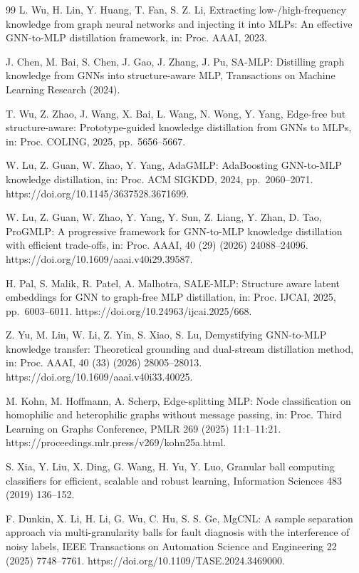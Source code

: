 \begin{thebibliography}{99}
L. Wu, H. Lin, Y. Huang, T. Fan, S. Z. Li, Extracting low-/high-frequency knowledge from graph neural networks and injecting it into MLPs: An effective GNN-to-MLP distillation framework, in: Proc. AAAI, 2023.

J. Chen, M. Bai, S. Chen, J. Gao, J. Zhang, J. Pu, SA-MLP: Distilling graph knowledge from GNNs into structure-aware MLP, Transactions on Machine Learning Research (2024).

T. Wu, Z. Zhao, J. Wang, X. Bai, L. Wang, N. Wong, Y. Yang, Edge-free but structure-aware: Prototype-guided knowledge distillation from GNNs to MLPs, in: Proc. COLING, 2025, pp.~5656--5667.

W. Lu, Z. Guan, W. Zhao, Y. Yang, AdaGMLP: AdaBoosting GNN-to-MLP knowledge distillation, in: Proc. ACM SIGKDD, 2024, pp.~2060--2071. https://doi.org/10.1145/3637528.3671699.

W. Lu, Z. Guan, W. Zhao, Y. Yang, Y. Sun, Z. Liang, Y. Zhan, D. Tao, ProGMLP: A progressive framework for GNN-to-MLP knowledge distillation with efficient trade-offs, in: Proc. AAAI, 40 (29) (2026) 24088--24096. https://doi.org/10.1609/aaai.v40i29.39587.

H. Pal, S. Malik, R. Patel, A. Malhotra, SALE-MLP: Structure aware latent embeddings for GNN to graph-free MLP distillation, in: Proc. IJCAI, 2025, pp.~6003--6011. https://doi.org/10.24963/ijcai.2025/668.

Z. Yu, M. Lin, W. Li, Z. Yin, S. Xiao, S. Lu, Demystifying GNN-to-MLP knowledge transfer: Theoretical grounding and dual-stream distillation method, in: Proc. AAAI, 40 (33) (2026) 28005--28013. https://doi.org/10.1609/aaai.v40i33.40025.

M. Kohn, M. Hoffmann, A. Scherp, Edge-splitting MLP: Node classification on homophilic and heterophilic graphs without message passing, in: Proc. Third Learning on Graphs Conference, PMLR 269 (2025) 11:1--11:21. https://proceedings.mlr.press/v269/kohn25a.html.

S. Xia, Y. Liu, X. Ding, G. Wang, H. Yu, Y. Luo, Granular ball computing classifiers for efficient, scalable and robust learning, Information Sciences 483 (2019) 136--152.

F. Dunkin, X. Li, H. Li, G. Wu, C. Hu, S. S. Ge, MgCNL: A sample separation approach via multi-granularity balls for fault diagnosis with the interference of noisy labels, IEEE Transactions on Automation Science and Engineering 22 (2025) 7748--7761. https://doi.org/10.1109/TASE.2024.3469000.


\end{thebibliography}
